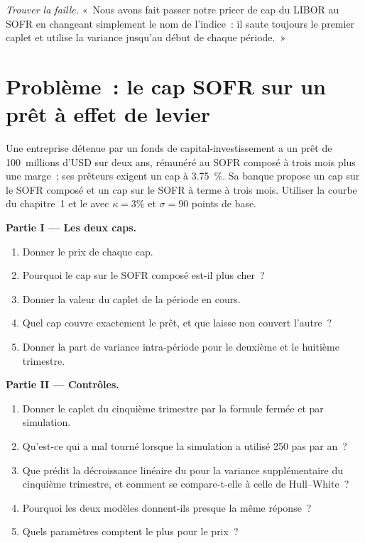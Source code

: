 \begin{exercise}[$\star\star\star$]\label{exo:rc:modelling-overnight-rate-products:8}
\emph{Trouver la faille.} «~Nous avons fait passer notre pricer de cap du LIBOR au SOFR en
changeant simplement le nom de l'indice~: il saute toujours le premier caplet et utilise
la variance jusqu'au début de chaque période.~»
\end{exercise}

\section{Problème~: le cap SOFR sur un prêt à effet de levier}

\begin{problem}\label{pb:rc:modelling-overnight-rate-products:1}
Une entreprise détenue par un fonds de capital-investissement a un prêt de 100~millions d'USD sur deux ans, rémunéré au
SOFR composé à trois mois plus une marge~; ses prêteurs exigent un cap à 3.75~\%. Sa banque propose un
cap sur le SOFR composé et un cap sur le SOFR à terme à trois mois. Utiliser la courbe du chapitre~1 et
le  avec $\kappa=3\%$ et $\sigma=90$ points de base.

\medskip\noindent\textbf{Partie I --- Les deux caps.}
\begin{enumerate}
\item Donner le prix de chaque cap.
\item Pourquoi le cap sur le SOFR composé est-il plus cher~?
\item Donner la valeur du caplet de la période en cours.
\item Quel cap couvre exactement le prêt, et que laisse non couvert l'autre~?
\item Donner la part de variance intra-période pour le deuxième et le huitième trimestre.
\end{enumerate}

\medskip\noindent\textbf{Partie II --- Contrôles.}
\begin{enumerate}[resume]
\item Donner le caplet du cinquième trimestre par la formule fermée et par simulation.
\item Qu'est-ce qui a mal tourné lorsque la simulation a utilisé 250 pas par an~?
\item Que prédit la décroissance linéaire du  pour la
variance supplémentaire du cinquième trimestre, et comment se compare-t-elle à celle de Hull--White~?
\item Pourquoi les deux modèles donnent-ils presque la même réponse~?
\item Quels paramètres comptent le plus pour le prix~?
\end{enumerate}


\end{problem}
